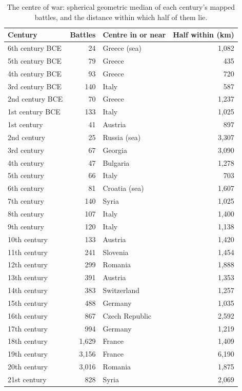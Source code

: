 \documentclass[11pt,a4paper]{article}
\begin{document}
\begin{table}[tbp]\centering\small\caption{The centre of war: spherical geometric median of each century's mapped battles, and the distance within which half of them lie.}\label{tab:centres}\begin{tabular}{lrlr}\toprule Century & Battles & Centre in or near & Half within (km)\\\midrule
6th century BCE & 24 & Greece (sea) & 1,082\\
5th century BCE & 79 & Greece & 435\\
4th century BCE & 93 & Greece & 720\\
3rd century BCE & 140 & Italy & 587\\
2nd century BCE & 70 & Greece & 1,237\\
1st century BCE & 133 & Italy & 1,025\\
1st century & 41 & Austria & 897\\
2nd century & 25 & Russia (sea) & 3,307\\
3rd century & 67 & Georgia & 3,090\\
4th century & 47 & Bulgaria & 1,278\\
5th century & 66 & Italy & 703\\
6th century & 81 & Croatia (sea) & 1,607\\
7th century & 140 & Syria & 1,025\\
8th century & 107 & Italy & 1,400\\
9th century & 120 & Italy & 1,138\\
10th century & 133 & Austria & 1,420\\
11th century & 241 & Slovenia & 1,454\\
12th century & 299 & Romania & 1,888\\
13th century & 391 & Austria & 1,353\\
14th century & 383 & Switzerland & 1,257\\
15th century & 488 & Germany & 1,035\\
16th century & 867 & Czech Republic & 2,592\\
17th century & 994 & Germany & 1,219\\
18th century & 1,629 & France & 1,409\\
19th century & 3,156 & France & 6,190\\
20th century & 3,016 & Romania & 1,875\\
21st century & 828 & Syria & 2,069\\
\bottomrule\end{tabular}\end{table}
\end{document}
